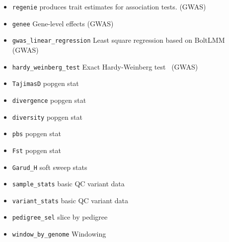 \documentclass[a4paper,num-refs]{oup-contemporary}
\newcommand{\sgapi}[1]{\texttt{#1}}
\begin{document}
\begin{itemize}
\item \sgapi{regenie} produces trait estimates for association tests.
\citep{mbatchou2021computationally} (GWAS)
\item \sgapi{genee} Gene-level effects
\citep{cheng2020estimation} (GWAS)
\item \sgapi{gwas\_linear\_regression} Least square regression based
on BoltLMM~\citep{loh2015efficient} (GWAS)
\item \sgapi{hardy\_weinberg\_test} Exact Hardy-Weinberg
test~\citep{wigginton2005note} (GWAS)

\item \sgapi{TajimasD} popgen stat
\item \sgapi{divergence} popgen stat
\item \sgapi{diversity} popgen stat
\item \sgapi{pbs} popgen stat
\item \sgapi{Fst} popgen stat
\item \sgapi{Garud\_H} soft sweep stats~\citep{garud2015recent}


\item \sgapi{sample\_stats} basic QC variant data

\item \sgapi{variant\_stats} basic QC variant data

\item \sgapi{pedigree\_sel} slice by pedigree

\item \sgapi{window\_by\_genome} Windowing

\end{itemize}
\end{document}
